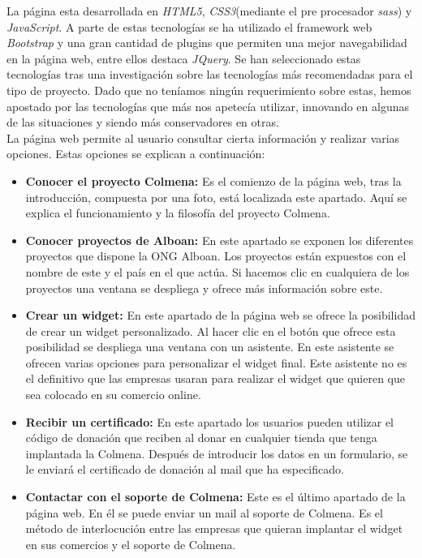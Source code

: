 La página esta desarrollada en \textit{HTML5}, \textit{CSS3}(mediante el pre procesador \textit{sass}) y \textit{JavaScript}. A parte de estas tecnologías se ha utilizado el framework web \textit{Bootstrap} y una gran cantidad de plugins que permiten una mejor navegabilidad en la página web, entre ellos destaca \textit{JQuery}. Se han seleccionado estas tecnologías tras una investigación sobre las tecnologías más recomendadas para el tipo de proyecto. Dado que no teníamos ningún requerimiento sobre estas, hemos apostado por las tecnologías que más nos apetecía utilizar, innovando en algunas de las situaciones y siendo más conservadores en otras.\\

La página web permite al usuario consultar cierta información y realizar varias opciones. Estas opciones se explican a continuación:

\begin{itemize}
	\item \textbf{Conocer el proyecto Colmena:} Es el comienzo de la página web, tras la introducción, compuesta por una foto, está localizada este apartado. Aquí se explica el funcionamiento y la filosofía del proyecto Colmena.
	\item \textbf{Conocer proyectos de Alboan:} En este apartado se exponen los diferentes proyectos que dispone la ONG Alboan. Los proyectos están expuestos con el nombre de este y el país en el que actúa. Si hacemos clic en cualquiera de los proyectos una ventana se despliega y ofrece más información sobre este.
	\item \textbf{Crear un widget:} En este apartado de la página web se ofrece la posibilidad de crear un widget personalizado. Al hacer clic en el botón que ofrece esta posibilidad se despliega una ventana con un asistente. En este asistente se ofrecen varias opciones para personalizar el widget final. Este asistente no es el definitivo que las empresas usaran para realizar el widget que quieren que sea colocado en su comercio online.
	\item \textbf{Recibir un certificado:} En este apartado los usuarios pueden utilizar el código de donación que reciben al donar en cualquier tienda que tenga implantada la Colmena. Después de introducir los datos en un formulario, se le enviará el certificado de donación al mail que ha especificado.
	\item \textbf{Contactar con el soporte de Colmena:} Este es el último apartado de la página web. En él se puede enviar un mail al soporte de Colmena. Es el método de interlocución entre las empresas que quieran implantar el widget en sus comercios y el soporte de Colmena.
\end{itemize}
\newpage
